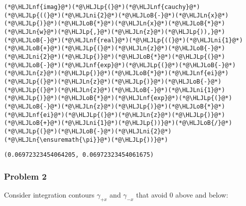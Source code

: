 \documentclass[12pt,a4paper]{article}
\newcommand{\HLJLn}[1]{#1}
\newcommand{\HLJLnf}[1]{\textcolor[RGB]{66,102,213}{#1}}
\newcommand{\HLJLni}[1]{\textcolor[RGB]{59,151,46}{#1}}
\newcommand{\HLJLoB}[1]{\textcolor[RGB]{102,102,102}{\textbf{#1}}}
\newcommand{\HLJLp}[1]{#1}
\begin{document}
\begin{lstlisting}
(*@\HLJLnf{imag}@*)(*@\HLJLp{(}@*)(*@\HLJLnf{cauchy}@*)(*@\HLJLp{((}@*)(*@\HLJLni{2}@*)(*@\HLJLoB{-}@*)(*@\HLJLn{x}@*)(*@\HLJLp{)}@*)(*@\HLJLoB{*}@*)(*@\HLJLn{x}@*)(*@\HLJLoB{*}@*)(*@\HLJLn{w}@*)(*@\HLJLp{,}@*)(*@\HLJLn{z}@*)(*@\HLJLp{)),}@*)(*@\HLJLoB{-}@*)(*@\HLJLnf{real}@*)(*@\HLJLp{((}@*)(*@\HLJLni{1}@*)(*@\HLJLoB{+}@*)(*@\HLJLp{(}@*)(*@\HLJLn{z}@*)(*@\HLJLoB{-}@*)(*@\HLJLni{2}@*)(*@\HLJLp{)}@*)(*@\HLJLoB{*}@*)(*@\HLJLp{(}@*)(*@\HLJLoB{-}@*)(*@\HLJLnf{exp}@*)(*@\HLJLp{(}@*)(*@\HLJLoB{-}@*)(*@\HLJLn{z}@*)(*@\HLJLp{)}@*)(*@\HLJLoB{*}@*)(*@\HLJLnf{ei}@*)(*@\HLJLp{(}@*)(*@\HLJLn{z}@*)(*@\HLJLp{)}@*)(*@\HLJLoB{-}@*)(*@\HLJLp{(}@*)(*@\HLJLn{z}@*)(*@\HLJLoB{-}@*)(*@\HLJLni{1}@*)(*@\HLJLp{)}@*)(*@\HLJLoB{*}@*)(*@\HLJLnf{exp}@*)(*@\HLJLp{(}@*)(*@\HLJLoB{-}@*)(*@\HLJLn{z}@*)(*@\HLJLp{)}@*)(*@\HLJLoB{*}@*)(*@\HLJLnf{ei}@*)(*@\HLJLp{(}@*)(*@\HLJLn{z}@*)(*@\HLJLp{)}@*)(*@\HLJLoB{+}@*)(*@\HLJLni{1}@*)(*@\HLJLp{))}@*)(*@\HLJLoB{/}@*)(*@\HLJLp{(}@*)(*@\HLJLoB{-}@*)(*@\HLJLni{2}@*)(*@\HLJLn{\ensuremath{\pi}}@*)(*@\HLJLp{))}@*)
\end{lstlisting}

\begin{lstlisting}
(0.06972323454064205, 0.06972323454061675)
\end{lstlisting}


\subsubsection{Problem 2}
Consider integration contours $\gamma_{+x}$ and $\gamma_{-x}$ that avoid $0$ above and below:
\end{document}
